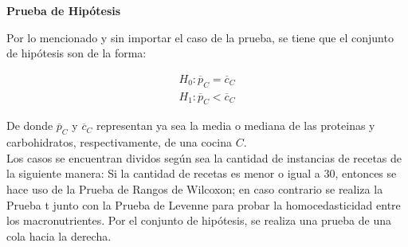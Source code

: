 \documentclass[12pt,a4paper]{article}
\begin{document}
        \textbf{Prueba de Hipótesis}\\
        {
            Por lo mencionado y sin importar el caso de la prueba, se tiene que el 
            conjunto de hipótesis son de la forma:

            \begin{align*}
                H_0 : \overline{p}_C = \overline{c}_C \\
                H_1 : \overline{p}_C < \overline{c}_C
            \end{align*}

            De donde $\overline{p}_C$ y $\overline{c}_C$ representan ya sea la media o 
            mediana de las proteinas y carbohidratos, respectivamente, de una cocina $C$.\\

            Los casos se encuentran dividos según sea la cantidad de instancias de recetas 
            de la siguiente manera: Si la cantidad de recetas es menor 
            o igual a $30$, entonces se hace uso de la Prueba de Rangos de Wilcoxon; en 
            caso contrario se realiza la Prueba t junto con la Prueba de Levenne para 
            probar la homocedasticidad entre los macronutrientes. Por el conjunto de hipótesis, 
            se realiza una prueba de una cola hacia la derecha.\\
        }
\end{document}
